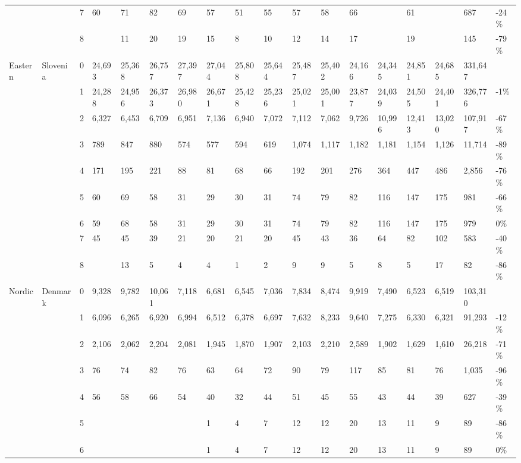 \begin{longtable}{llllllllllllllllll}
   &  & 7 & 60 & 71 & 82 & 69 & 57 & 51 & 55 & 57 & 58 & 66 &  & 61 &  & 687 & -24\% \\ 
   &  & 8 &  & 11 & 20 & 19 & 15 & 8 & 10 & 12 & 14 & 17 &  & 19 &  & 145 & -79\% \\ 
  Eastern & Slovenia & 0 & 24,693 & 25,368 & 26,757 & 27,397 & 27,044 & 25,808 & 25,644 & 25,487 & 25,402 & 24,166 & 24,345 & 24,851 & 24,685 & 331,647 &  \\ 
   &  & 1 & 24,288 & 24,956 & 26,373 & 26,980 & 26,671 & 25,428 & 25,236 & 25,021 & 25,001 & 23,877 & 24,039 & 24,505 & 24,401 & 326,776 & -1\% \\ 
   &  & 2 & 6,327 & 6,453 & 6,709 & 6,951 & 7,136 & 6,940 & 7,072 & 7,112 & 7,062 & 9,726 & 10,996 & 12,413 & 13,020 & 107,917 & -67\% \\ 
   &  & 3 & 789 & 847 & 880 & 574 & 577 & 594 & 619 & 1,074 & 1,117 & 1,182 & 1,181 & 1,154 & 1,126 & 11,714 & -89\% \\ 
   &  & 4 & 171 & 195 & 221 & 88 & 81 & 68 & 66 & 192 & 201 & 276 & 364 & 447 & 486 & 2,856 & -76\% \\ 
   &  & 5 & 60 & 69 & 58 & 31 & 29 & 30 & 31 & 74 & 79 & 82 & 116 & 147 & 175 & 981 & -66\% \\ 
   &  & 6 & 59 & 68 & 58 & 31 & 29 & 30 & 31 & 74 & 79 & 82 & 116 & 147 & 175 & 979 & 0\% \\ 
   &  & 7 & 45 & 45 & 39 & 21 & 20 & 21 & 20 & 45 & 43 & 36 & 64 & 82 & 102 & 583 & -40\% \\ 
   &  & 8 &  & 13 & 5 & 4 & 4 & 1 & 2 & 9 & 9 & 5 & 8 & 5 & 17 & 82 & -86\% \\ 
  Nordic & Denmark & 0 & 9,328 & 9,782 & 10,061 & 7,118 & 6,681 & 6,545 & 7,036 & 7,834 & 8,474 & 9,919 & 7,490 & 6,523 & 6,519 & 103,310 &  \\ 
   &  & 1 & 6,096 & 6,265 & 6,920 & 6,994 & 6,512 & 6,378 & 6,697 & 7,632 & 8,233 & 9,640 & 7,275 & 6,330 & 6,321 & 91,293 & -12\% \\ 
   &  & 2 & 2,106 & 2,062 & 2,204 & 2,081 & 1,945 & 1,870 & 1,907 & 2,103 & 2,210 & 2,589 & 1,902 & 1,629 & 1,610 & 26,218 & -71\% \\ 
   &  & 3 & 76 & 74 & 82 & 76 & 63 & 64 & 72 & 90 & 79 & 117 & 85 & 81 & 76 & 1,035 & -96\% \\ 
   &  & 4 & 56 & 58 & 66 & 54 & 40 & 32 & 44 & 51 & 45 & 55 & 43 & 44 & 39 & 627 & -39\% \\ 
   &  & 5 &  &  &  &  & 1 & 4 & 7 & 12 & 12 & 20 & 13 & 11 & 9 & 89 & -86\% \\ 
   &  & 6 &  &  &  &  & 1 & 4 & 7 & 12 & 12 & 20 & 13 & 11 & 9 & 89 & 0\% \\ 

\end{longtable}
